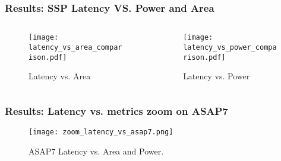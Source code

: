 \begin{frame}
    \frametitle{Results: SSP Latency VS. Power and Area}

    \tiny
    \begin{columns}
        \begin{column}{0.5\textwidth}
	\begin{figure}[H]
            \centering
		\vspace{1mm}
            \texttt{[image: latency\_vs\_area\_comparison.pdf]}
		\vspace{-3mm}
            \caption{Latency vs. Area}
	\end{figure}
        \end{column}

        \begin{column}{0.5\textwidth}
	\begin{figure}[H]
            \centering
		\vspace{1mm}
            \texttt{[image: latency\_vs\_power\_comparison.pdf]}
		\vspace{-3mm}
            \caption{Latency vs. Power}
	\end{figure}
        \end{column}
    \end{columns}

\end{frame}

\begin{frame}
    \frametitle{Results: Latency vs. metrics zoom on ASAP7}

    \tiny
	\begin{figure}[H]
            \centering
            \texttt{[image: zoom\_latency\_vs\_asap7.png]}
		\vspace{-2mm}
		\caption{ASAP7 Latency vs. Area and Power.}
	\end{figure}

    \normalsize

\end{frame}

